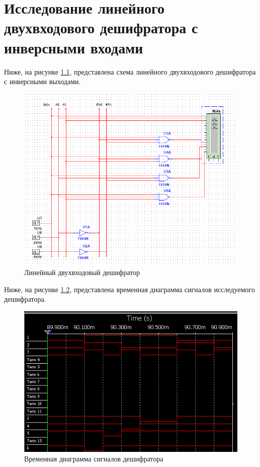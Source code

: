 \chapter{Исследование линейного двухвходового дешифратора с инверсными входами}

Ниже, на рисунке \ref{fig:dc2-4}, представлена схема линейного двухвходового дешифратора с инверсными выходами.

\begin{figure}[ht]
	\centering
	\includegraphics[width=\linewidth]{img/DC2-4}
	\caption{Линейный двухвходовый дешифратор}
	\label{fig:dc2-4}
\end{figure}

\pagebreak

Ниже, на рисунке \ref{fig:dc2-4-out}, представлена временная диаграмма сигналов исследуемого дешифратора.

\begin{figure}[ht]
	\centering
	\includegraphics[width=0.6\linewidth]{img/DC2-4-out}
	\caption{Временная диаграмма сигналов дешифратора}
	\label{fig:dc2-4-out}
\end{figure}


